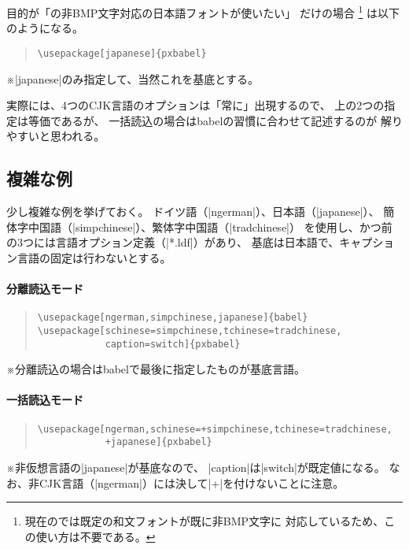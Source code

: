 \documentclass[uplatex,dvipdfmx,a4paper]{jsarticle}
\newcommand{\Pkg}[1]{\textsf{#1}}
\newcommand{\Note}{\par\noindent ※}
\newcommand{\XS}{\hspace{\xkanjiskip}}
\begin{document}
目的が「{\upTeX}の非BMP文字対応の日本語フォントが使いたい」
だけの場合
\footnote{現在の{\upLaTeX}では既定の和文フォントが既に非BMP文字に
対応しているため、この使い方は不要である。}%
は以下のようになる。

\begin{quote}\begin{verbatim}
\usepackage[japanese]{pxbabel}
\end{verbatim}\end{quote}
\Note |japanese|のみ指定して、当然これを基底とする。

実際には、4つのCJK言語のオプションは「常に」出現するので、
上の2つの指定は等価であるが、
一括読込の場合は\Pkg{babel}の習慣に合わせて記述するのが
解りやすいと思われる。

\subsection{複雑な例}
\label{ssec:complex-loading}

少し複雑な例を挙げておく。
ドイツ語（|ngerman|）、日本語（|japanese|）、
簡体字中国語（|simpchinese|）、繁体字中国語（|tradchinese|）
を使用し、かつ前の3つには言語オプション定義（|*.ldf|）があり、
基底は日本語で、キャプション言語の固定は行わないとする。

\paragraph{分離読込モード}

\begin{quote}\begin{verbatim}
\usepackage[ngerman,simpchinese,japanese]{babel}
\usepackage[schinese=simpchinese,tchinese=tradchinese,
            caption=switch]{pxbabel}
\end{verbatim}\end{quote}

\Note 分離読込の場合は\Pkg{babel}で最後に指定したものが基底言語。

\paragraph{一括読込モード}
\begin{quote}\begin{verbatim}
\usepackage[ngerman,schinese=+simpchinese,tchinese=tradchinese,
            +japanese]{pxbabel}
\end{verbatim}\end{quote}

\Note 非仮想言語の|japanese|が基底なので、
|caption|は|switch|が既定値になる。
なお、非CJK言語（|ngerman|）には決して\XS|+|\XS を付けないことに注意。

\end{document}
